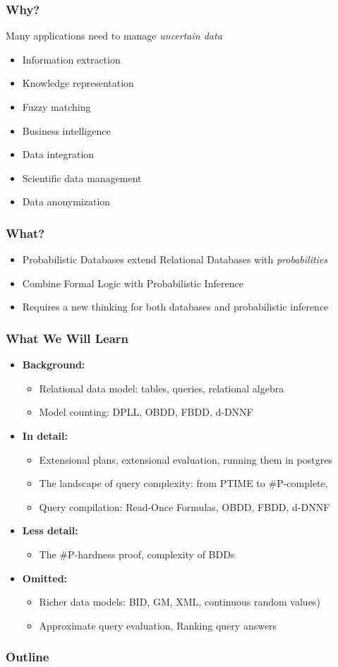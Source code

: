 \documentclass{beamer}
\newcommand{\bi}{\begin{itemize}}
\newcommand{\ei}{\end{itemize}}
\newcommand{\ii}{\item}
\newcommand*{\myblue}[1]{\textcolor{myblue}{#1}}
\newcommand*{\myred}[1]{\textcolor{myred}{#1}}
\begin{document}
\begin{frame}
\frametitle{Why?}
Many applications need to manage \myred{\textit{uncertain data}}
\bi
\ii Information extraction
\ii Knowledge representation
\ii Fuzzy matching
\ii Business intelligence
\ii Data integration
\ii Scientific data management
\ii Data anonymization
\ei
\end{frame}


\begin{frame}
\frametitle{What?}
\bi
\ii \myblue{Probabilistic Databases} extend Relational Databases with \myred{\textit{probabilities}}

\ii Combine \myblue{Formal Logic} with \myred{Probabilistic Inference}

\ii Requires a new thinking for both databases and probabilistic inference

\ei
\end{frame}


\begin{frame}
\frametitle{What We Will Learn}
\bi
\ii \textbf{Background:}
\bi
\ii Relational data model: tables, queries, relational algebra
\ii Model counting: DPLL, OBDD, FBDD, d-DNNF
\ei
\ei

\bi
\ii \textbf{In detail:}
\bi
\ii Extensional plans, extensional evaluation, running them in postgres
\ii The landscape of query complexity: from PTIME to  \#P-complete,
\ii Query compilation: Read-Once Formulas, OBDD, FBDD, d-DNNF
\ei
\ei

\bi
\ii \textbf{Less detail:}
\bi
\ii The \#P-hardness proof, complexity of BDDs
\ei
\ei

\bi
\ii \textbf{Omitted:}
\bi
\ii Richer data models: BID, GM, XML, continuous random values)
\ii Approximate query evaluation, Ranking query answers
\ei
\ei

\end{frame}



\begin{frame}
\frametitle{Outline} %
\tableofcontents 
\end{frame}
\end{document}
